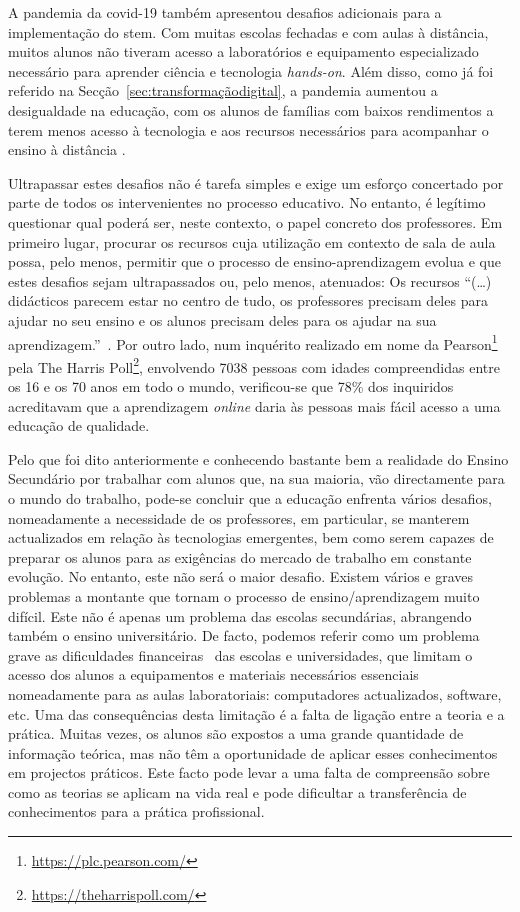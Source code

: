 A pandemia da \acrshort{covid-19} também apresentou desafios adicionais para a implementação do \acrshort{stem}. Com muitas escolas fechadas e com aulas à distância, muitos alunos não tiveram acesso a laboratórios e equipamento especializado necessário para aprender ciência e tecnologia \textit{hands-on}. Além disso, como já foi referido na Secção~\ref{sec:transformaçãodigital}, a pandemia aumentou a desigualdade na educação, com os alunos de famílias com baixos rendimentos a terem menos acesso à tecnologia e aos recursos necessários para acompanhar o ensino à distância \cite{desigualdadespandemia, efeitospandemiadigital}.

Ultrapassar estes desafios não é tarefa simples e exige um esforço concertado por parte de todos os intervenientes no processo educativo. No entanto, é legítimo questionar qual poderá ser, neste contexto, o papel concreto dos professores. Em primeiro lugar, procurar os recursos cuja utilização em contexto de sala de aula possa, pelo menos, permitir que o processo de ensino-aprendizagem evolua e que estes desafios sejam ultrapassados ou, pelo menos, atenuados: Os recursos ``(\ldots) didácticos parecem estar no centro de tudo, os professores precisam deles para ajudar no seu ensino e os alunos precisam deles para os ajudar na sua aprendizagem.''~\cite{virtuallabng}. Por outro lado, num inquérito \cite{pearson} realizado em nome da Pearson\footnote{\url{https://plc.pearson.com/}} pela The Harris Poll\footnote{\url{https://theharrispoll.com/}}, envolvendo 7038 pessoas com idades compreendidas entre os 16 e os 70 anos em todo o mundo, verificou-se que 78\% dos inquiridos acreditavam que a aprendizagem \textit{online} daria às pessoas mais fácil acesso a uma educação de qualidade. 

Pelo que foi dito anteriormente e conhecendo bastante bem a realidade do Ensino Secundário por trabalhar com alunos que, na sua maioria, vão directamente para o mundo do trabalho, pode-se concluir que a educação enfrenta vários desafios, nomeadamente a necessidade de os professores, em particular, se manterem actualizados em relação às tecnologias emergentes, bem como serem capazes de preparar os alunos para as exigências do mercado de trabalho em constante evolução. No entanto, este não será o maior desafio. Existem vários e graves problemas a montante que tornam o processo de ensino/aprendizagem muito difícil. Este não é apenas um problema das escolas secundárias, abrangendo também o ensino universitário. De facto, podemos referir como um problema grave as dificuldades financeiras~\cite{dificuldadesfinanciamento, Financiamentoprofissional, Educacaofinanciamento} das escolas e universidades, que limitam o acesso dos alunos a equipamentos e materiais necessários essenciais nomeadamente para as aulas laboratoriais: computadores actualizados, software, etc. Uma das consequências desta limitação é a falta de ligação entre a teoria e a prática. Muitas vezes, os alunos são expostos a uma grande quantidade de informação teórica, mas não têm a oportunidade de aplicar esses conhecimentos em projectos práticos. Este facto pode levar a uma falta de compreensão sobre como as teorias se aplicam na vida real e pode dificultar a transferência de conhecimentos para a prática profissional.

